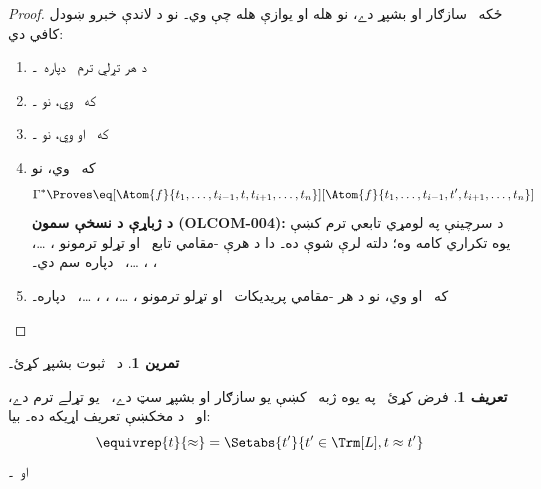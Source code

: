 \documentclass[12pt,a4paper,oneside]{report}
\theoremstyle{definition}
\newtheorem{defn}[thm]{تعريف}
\newtheorem{prob}[thm]{تمرين}
\begin{document}
\label{olpseg:OLP-0133-B008:start}
\begin{proof}
ځکه~\LR{$\Gamma^*$} سازګار او بشپړ دے، نو
\LR{$\eq[t][t'] \in \Gamma^*$} هله او يوازې هله چې
\LR{$\Gamma^* \Proves \eq[t][t']$} وي۔ نو د لاندې خبرو ښودل کافي دي:
\begin{enumerate}
\item د هر تړلي ترم~ دپاره~\LR{$\Gamma^* \Proves \eq[t][t]$}۔
\item که~\LR{$\Gamma^* \Proves \eq[t][t']$} وي، نو
  \LR{$\Gamma^* \Proves \eq[t'][t]$}۔
\item که~\LR{$\Gamma^* \Proves \eq[t][t']$} او
  \LR{$\Gamma^* \Proves \eq[t'][t'']$} وي، نو
  \LR{$\Gamma^* \Proves \eq[t][t'']$}۔
\item که~\LR{$\Gamma^* \Proves \eq[t][t']$} وي، نو
\[
\Gamma^* \Proves
\eq[\Atom{f}{t_1,\dots,t_{i-1},t,t_{i+1},\dots,t_n}][\Atom{f}{t_1,\dots,t_{i-1},t',t_{i+1},\dots,t_n}]
\]
\textbf{د ژباړې د نسخې سمون (OLCOM-004):} د سرچينې په لومړي
تابعي ترم کښې يوه تکراري کامه وه؛ دلته لرې شوې ده۔ دا د هرې
-مقامي تابع~ او تړلو ترمونو ، \dots،
، ، \dots،~ دپاره سم دي۔
\item که~\LR{$\Gamma^* \Proves \eq[t][t']$} او
 وي، نو
د هر -مقامي پريديکات~ او تړلو ترمونو ، \dots،
، ، \dots،~ دپاره۔
\end{enumerate}
\end{proof}
\label{olpseg:OLP-0133-B008:end}

\label{olpseg:OLP-0133-B009:start}
\begin{prob}
د~ ثبوت بشپړ کړئ۔
\end{prob}
\label{olpseg:OLP-0133-B009:end}

\label{olpseg:OLP-0133-B010:start}
\begin{defn}
فرض کړئ~\LR{$\Gamma^*$} په يوه ژبه~ کښې يو سازګار او
بشپړ سټ دے،~ يو تړلے ترم دے، او~\LR{$\approx$} د مخکښې
تعريف اړيکه ده۔ بيا:
\[
\equivrep{t}{\approx} = \Setabs{t'}{t'\in \Trm[L], t \approx t'}
\]
او~۔
\end{defn}
\label{olpseg:OLP-0133-B010:end}
\end{document}
